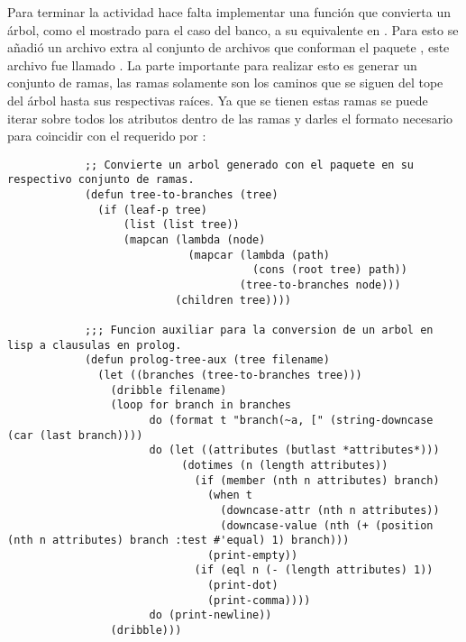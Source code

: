 \begin{itemize}
\begin{solution}
        Para terminar la actividad hace falta implementar una función que convierta un árbol, como el mostrado para el caso del banco, a su equivalente en . Para esto se añadió un archivo extra al conjunto de archivos que conforman el paquete , este archivo fue llamado . La parte importante para realizar esto es generar un conjunto de ramas, las ramas solamente son los caminos que se siguen del tope del árbol hasta sus respectivas raíces. Ya que se tienen estas ramas se puede iterar sobre todos los atributos dentro de las ramas y darles el formato necesario para coincidir con el requerido por :
        \begin{verbatim}
            ;; Convierte un arbol generado con el paquete en su respectivo conjunto de ramas.
            (defun tree-to-branches (tree)
              (if (leaf-p tree)
                  (list (list tree))
                  (mapcan (lambda (node)
                            (mapcar (lambda (path)
                                      (cons (root tree) path))
                                    (tree-to-branches node)))
                          (children tree))))
            
            ;;; Funcion auxiliar para la conversion de un arbol en lisp a clausulas en prolog.
            (defun prolog-tree-aux (tree filename)
              (let ((branches (tree-to-branches tree)))
                (dribble filename)
                (loop for branch in branches 
                      do (format t "branch(~a, [" (string-downcase (car (last branch))))
                      do (let ((attributes (butlast *attributes*)))
                           (dotimes (n (length attributes))
                             (if (member (nth n attributes) branch)
                               (when t
                                 (downcase-attr (nth n attributes))
                                 (downcase-value (nth (+ (position (nth n attributes) branch :test #'equal) 1) branch)))
                               (print-empty))
                             (if (eql n (- (length attributes) 1))
                               (print-dot)
                               (print-comma))))
                      do (print-newline))
                (dribble)))
            

\end{verbatim}
\end{solution}
\end{itemize}
